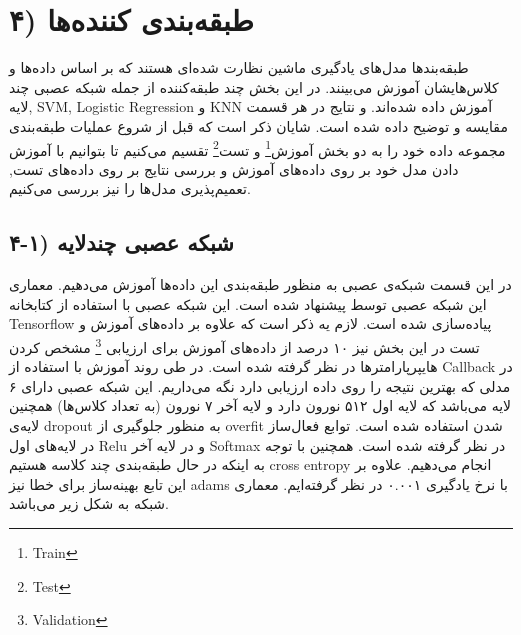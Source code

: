 \documentclass{article}
\begin{document}
 \section{۴) طبقه‌بندی کننده‌ها}
 طبقه‌بندها مدل‌های یادگیری ماشین نظارت شده‌ای هستند که بر اساس داده‌ها و کلاس‌هایشان آموزش می‌بینند. در این بخش چند طبقه‌کننده از جمله شبکه عصبی چند لایه, SVM, Logistic Regression و KNN آموزش داده شده‌اند. و نتایج در هر قسمت مقایسه و توضیح داده شده است.
 شایان ذکر است که قبل از شروع عملیات طبقه‌بندی مجموعه داده خود را به دو بخش آموزش\footnote{Train} و تست\footnote{Test} تقسیم می‌کنیم تا بتوانیم با آموزش دادن مدل خود بر روی داده‌های آموزش و  بررسی نتایج بر روی داده‌های تست, تعمیم‌پذیری مدل‌ها را نیز بررسی می‌کنیم.\newline
 
 
 
\subsection{۴-۱) شبکه عصبی چندلایه}

در این قسمت شبکه‌ی عصبی به منظور طبقه‌بندی این داده‌ها آموزش می‌دهیم. معماری این شبکه عصبی توسط \cite{Hello} پیشنهاد شده است. این شبکه عصبی با استفاده از کتابخانه Tensorflow پیاده‌سازی شده است.
لازم یه ذکر است که علاوه بر داده‌های آموزش و تست در این بخش نیز ۱۰ درصد از داده‌های آموزش برای ارزیابی \footnote{Validation} مشخص کردن هایپرپارامترها در نظر گرفته شده است. در طی روند آموزش با استفاده از Callback در مدلی که بهترین نتیجه را روی داده ارزیابی دارد نگه می‌داریم. 
این شبکه عصبی دارای ۶ لایه می‌باشد که لایه اول ۵۱۲ نورون دارد و لایه آخر ۷ نورون (به تعداد کلاس‌ها) همچنین لایه‌ی dropout به منظور جلوگیری از overfit شدن استفاده شده است. 
توابع فعال‌ساز در لایه‌های اول Relu و در لایه آخر Softmax در نظر گرفته شده است. همچنین با توجه به اینکه در حال طبقه‌بندی چند کلاسه هستیم cross entropy انجام می‌دهیم. علاوه بر این تابع بهینه‌ساز برای خطا نیز adams با نرخ یادگیری ۰.۰۰۱ در نظر گرفته‌ایم. معماری شبکه به شکل زیر می‌باشد.
\end{document}
